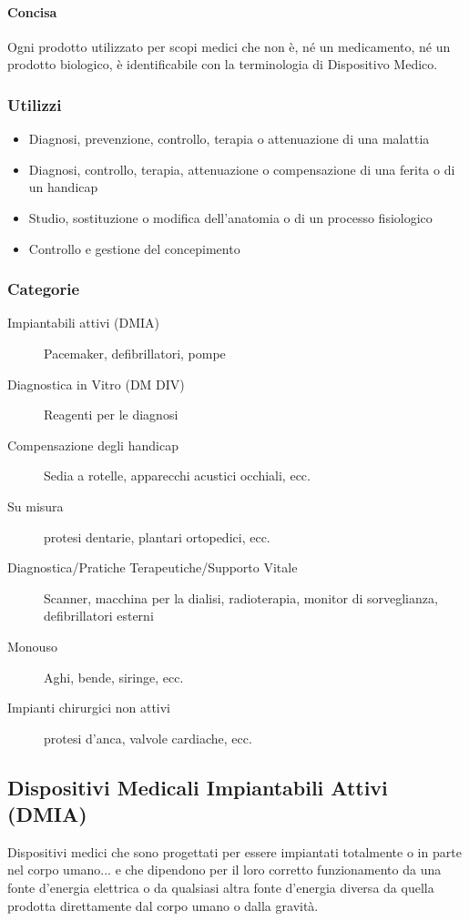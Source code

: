 \documentclass[a4paper]{article}
\begin{document}
\paragraph{Concisa}
Ogni prodotto utilizzato per scopi medici che non è, né un medicamento, né un 
prodotto biologico, è identificabile con la terminologia di Dispositivo Medico.
\subsubsection{Utilizzi}
\begin{itemize}
    \item Diagnosi, prevenzione, controllo, terapia o attenuazione di una 
    malattia
    \item Diagnosi, controllo, terapia, attenuazione o compensazione di una 
    ferita o di un handicap
    \item Studio, sostituzione o modifica dell'anatomia o di un processo 
    fisiologico
    \item Controllo e gestione del concepimento
\end{itemize}
\subsubsection{Categorie}
\begin{description}
    \item[Impiantabili attivi (DMIA)] Pacemaker, defibrillatori, pompe 
    \item[Diagnostica in Vitro (DM DIV)] Reagenti per le diagnosi
    \item[Compensazione degli handicap] Sedia a rotelle, apparecchi acustici
    occhiali, ecc.
    \item[Su misura] protesi dentarie, plantari ortopedici, ecc.
    \item[Diagnostica/Pratiche Terapeutiche/Supporto Vitale] Scanner, macchina
    per la dialisi, radioterapia, monitor di sorveglianza, defibrillatori
    esterni
    \item[Monouso] Aghi, bende, siringe, ecc.
    \item[Impianti chirurgici non attivi] protesi d'anca, valvole cardiache, ecc.
\end{description}
\subsection{Dispositivi Medicali Impiantabili Attivi (DMIA)}
Dispositivi medici che sono progettati per essere impiantati totalmente o in 
parte nel corpo umano... e che dipendono per il loro corretto funzionamento 
da una fonte d’energia elettrica o da qualsiasi altra fonte d’energia diversa 
da quella prodotta direttamente dal corpo umano o dalla gravità.
\end{document}
